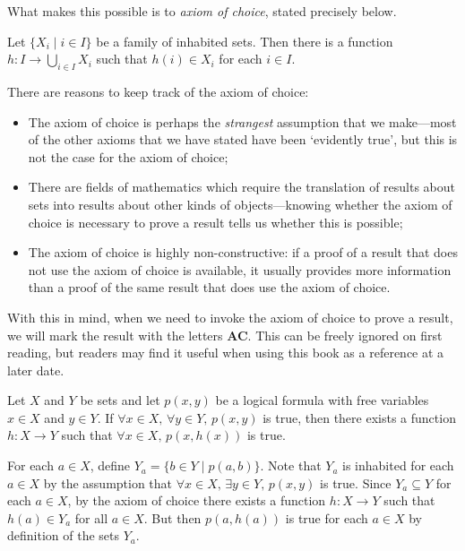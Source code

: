 What makes this possible is to \textit{axiom of choice}, stated precisely below.

\begin{axiom}
\label{axChoice}
Let $\{ X_i \mid i \in I \}$ be a family of inhabited sets. Then there is a function $h : I \to \bigcup\limits_{i \in I} X_i$ such that $h(i) \in X_i$ for each $i \in I$.
\end{axiom}

There are reasons to keep track of the axiom of choice:
\begin{itemize}
\item The axiom of choice is perhaps the \textit{strangest} assumption that we make---most of the other axioms that we have stated have been `evidently true', but this is not the case for the axiom of choice;
\item There are fields of mathematics which require the translation of results about sets into results about other kinds of objects---knowing whether the axiom of choice is necessary to prove a result tells us whether this is possible;
\item The axiom of choice is highly non-constructive: if a proof of a result that does not use the axiom of choice is available, it usually provides more information than a proof of the same result that does use the axiom of choice.
\end{itemize}

With this in mind, when we need to invoke the axiom of choice to prove a result, we will mark the result with the letters {\small \textbf{AC}}. This can be freely ignored on first reading, but readers may find it useful when using this book as a reference at a later date.

\begin{propositionac}
\label{propUsingAC}
Let $X$ and $Y$ be sets and let $p(x,y)$ be a logical formula with free variables $x \in X$ and $y \in Y$. If $\forall x \in X,\, \forall y \in Y,\, p(x,y)$ is true, then there exists a function $h : X \to Y$ such that $\forall x \in X,\, p(x,h(x))$ is true.
\end{propositionac}

\begin{cproof}
For each $a \in X$, define $Y_a = \{ b \in Y \mid p(a,b) \}$. Note that $Y_a$ is inhabited for each $a \in X$ by the assumption that $\forall x \in X,\, \exists y \in Y,\, p(x,y)$ is true. Since $Y_a \subseteq Y$ for each $a \in X$, by the axiom of choice there exists a function $h : X \to Y$ such that $h(a) \in Y_a$ for all $a \in X$. But then $p(a,h(a))$ is true for each $a \in X$ by definition of the sets $Y_a$.
\end{cproof}

